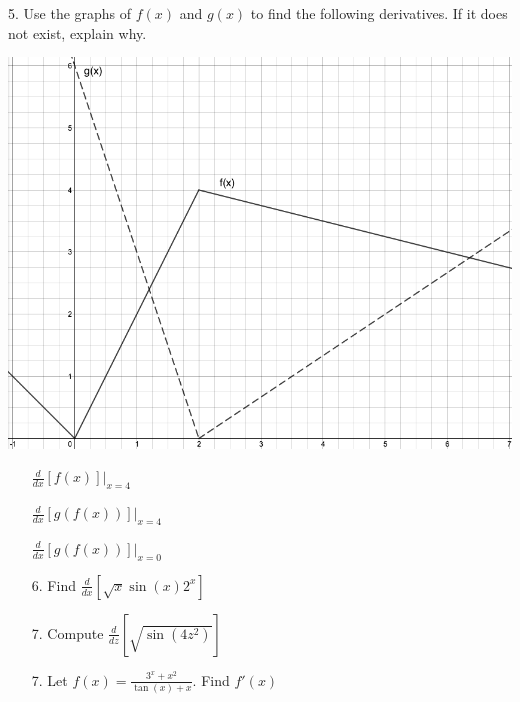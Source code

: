 \documentclass[12pt]{article}
\begin{document}
5. Use the graphs of $f(x)$ and $g(x)$ to find the following derivatives. If it does not exist, explain why.
\begin{multicols}{2}
\includegraphics[scale=0.35]{Chain2.png}

\begin{itemize} %
\item[ ] \;\;\;\;\;$\displaystyle\frac{d}{dx}\left[f(x)\right]\Bigg|_{x=4}$

\vspace{1in}


\item[ ] \;\;\;\;\;$\displaystyle\frac{d}{dx}\left[g(f(x))\right]\Bigg|_{x=4}$

\vspace{1in}

\item[ ]\;\;\;\;\; $\displaystyle\frac{d}{dx}\left[g(f(x))\right]\Bigg|_{x=0}$

\end{itemize}
\end{multicols}
\newpage
\begin{itemize}
    \item[6.] Find $\displaystyle{\frac{d}{dx}\left[\sqrt{x}\sin(x)2^x\right]}$
    \vspace{3in}
    \item[7.] Compute $\displaystyle{\frac{d}{dz}\left[\sqrt{\sin(4z^2)}\right]}$
    \vspace{3in}
    \item[7.] Let $\displaystyle{f(x)=\frac{3^x+x^2}{\tan(x)+x}}$. Find $f'(x)$
\end{itemize}
\end{document}
